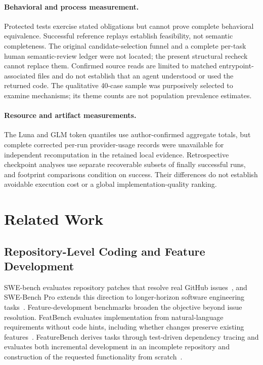 \documentclass[acmsmall,screen,review,anonymous]{acmart}
\begin{document}
\paragraph{Behavioral and process measurement.}
Protected tests exercise stated obligations but cannot prove complete
behavioral equivalence. Successful reference replays establish feasibility,
not semantic completeness. The original candidate-selection funnel and a
complete per-task human semantic-review ledger were not located; the present
structural recheck cannot replace them. Confirmed source reads are limited to
matched entrypoint-associated files and do not establish that an agent
understood or used the returned code. The qualitative 40-case sample was
purposively selected to examine mechanisms; its theme counts are not population
prevalence estimates.

\paragraph{Resource and artifact measurements.}
The Luna and GLM token quantiles use author-confirmed aggregate totals, but
complete corrected per-run provider-usage records were unavailable for
independent recomputation in the retained local evidence. Retrospective
checkpoint analyses use separate recoverable subsets of finally successful
runs, and footprint comparisons condition on success. Their differences do
not establish avoidable execution cost or a global implementation-quality
ranking.

\section{Related Work}
\label{sec:related-work}

\subsection{Repository-Level Coding and Feature Development}

SWE-bench evaluates repository patches that resolve real GitHub
issues~\cite{jimenez2024swebench}, and SWE-Bench Pro extends this direction to
longer-horizon software engineering tasks~\cite{deng2025swebenchpro}.
Feature-development benchmarks broaden the objective beyond issue resolution.
FeatBench evaluates implementation from natural-language requirements without
code hints, including whether changes preserve existing
features~\cite{chen2026featbench}. FeatureBench derives tasks through test-driven
dependency tracing and evaluates both incremental development in an incomplete
repository and construction of the requested functionality from
scratch~\cite{zhou2026featurebench}.
\end{document}

